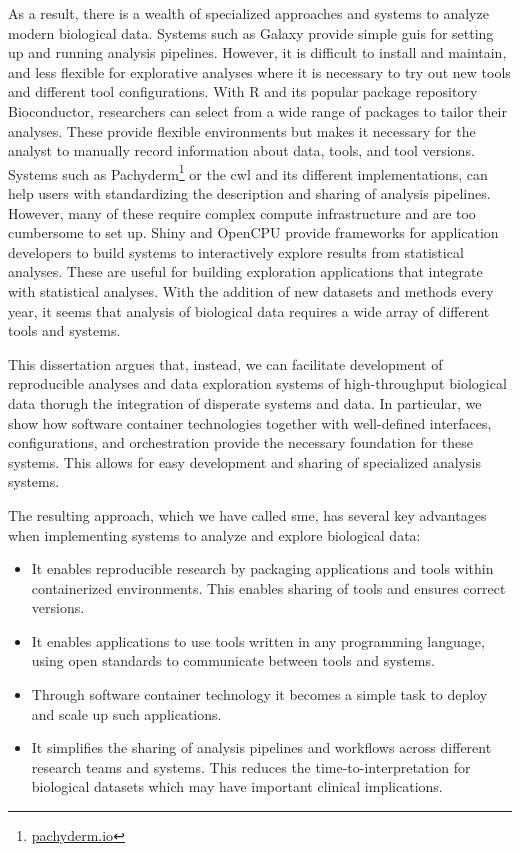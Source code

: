 As a result, there is a wealth of specialized approaches and systems to analyze
modern biological data. Systems such as Galaxy\cite{galaxy} provide simple
\glspl{gui} for setting up and running analysis pipelines. However, it is
difficult to install and maintain, and less flexible for explorative analyses
where it is necessary to try out new tools and different tool
configurations.\cite{spjuth2015experiences} With R and its popular package
repository Bioconductor, researchers can select from a wide range of packages to
tailor their analyses. These provide flexible environments but makes it
necessary for the analyst to manually record information about data, tools, and
tool versions. Systems such as Pachyderm\footnote{\url{pachyderm.io}} or the
\gls{cwl}\cite{commonwl} and its different implementations, can help users with
standardizing the description and sharing of analysis pipelines.  However, many
of these require complex compute infrastructure and are too cumbersome to set
up.  Shiny and OpenCPU provide frameworks for application developers to build
systems to interactively explore results from statistical analyses.  These are
useful for building exploration applications that integrate with
statistical analyses.  With the addition of new datasets and methods every year,
it seems that analysis of biological data requires a wide array of different
tools and systems.

This dissertation argues that, instead, we can facilitate development of
reproducible analyses and data exploration systems of high-throughput biological
data thorugh the integration of disperate systems and data. In particular, we
show how software container technologies together with well-defined interfaces,
configurations, and orchestration provide the necessary foundation for these
systems. This allows for easy development and sharing of specialized analysis
systems. 

The resulting approach, which we have called \gls{sme}, has several
key advantages when implementing systems to analyze and explore biological data:
\begin{itemize} 
    \item It enables reproducible research by packaging applications
        and tools within containerized environments. This enables sharing of
        tools and ensures correct versions. 

    \item It enables applications to use tools written in any programming
        language, using open standards to communicate between tools and systems.

    \item Through software container technology it becomes a simple task to
        deploy and scale up such applications. 
        
    \item It simplifies the sharing of analysis pipelines and workflows across
        different research teams and systems. This reduces the
        time-to-interpretation for biological datasets which may have important
        clinical implications. 
\end{itemize} 

